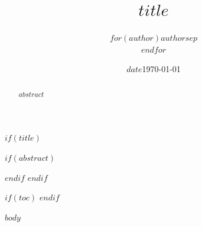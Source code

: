 \documentclass[11pt,a4paper]{article}
\title{$title$}
\author{$for(author)$$author$$sep$ \\ $endfor$}
\date{$date$}
\date{\today}
\begin{document}
$if(title)$
\maketitle
$if(abstract)$
\begin{abstract}
$abstract$
\end{abstract}
$endif$
\thispagestyle{empty}
\newpage
$endif$

$if(toc)$
\tableofcontents
\newpage
$endif$

$body$
\end{document}
